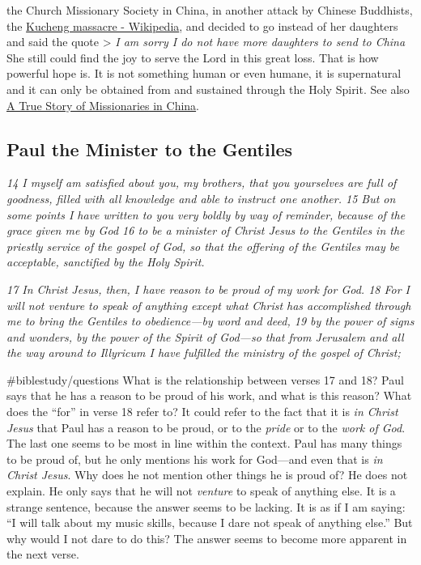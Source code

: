 the Church Missionary Society in China, in another attack by Chinese
Buddhists, the
\href{\%5Bhttps://en.wikipedia.org/wiki/Kucheng_massacre\%5D(https://en.wikipedia.org/wiki/Kucheng_massacre)}{Kucheng
massacre - Wikipedia}, and decided to go instead of her daughters and
said the quote \textgreater{} \emph{I am sorry I do not have more
daughters to send to China}\\
She still could find the joy to serve the Lord in this great loss. That
is how powerful hope is. It is not something human or even humane, it is
supernatural and it can only be obtained from and sustained through the
Holy Spirit. See also
\href{\%5Bhttps://www.youtube.com/watch?v=-DSjhwICEB4\%5D(https://www.youtube.com/watch?v=-DSjhwICEB4)}{A
True Story of Missionaries in China}.

\subsection{Paul the Minister to the Gentiles} \emph{14 I myself am
satisfied about you, my brothers, that you yourselves are full of
goodness, filled with all knowledge and able to instruct one another. 15
But on some points I have written to you very boldly by way of reminder,
because of the grace given me by God 16 to be a minister of Christ Jesus
to the Gentiles in the priestly service of the gospel of God, so that
the offering of the Gentiles may be acceptable, sanctified by the Holy
Spirit.}

\emph{17 In Christ Jesus, then, I have reason to be proud of my work for
God. 18 For I will not venture to speak of anything except what Christ
has accomplished through me to bring the Gentiles to obedience---by word
and deed, 19 by the power of signs and wonders, by the power of the
Spirit of God---so that from Jerusalem and all the way around to
Illyricum I have fulfilled the ministry of the gospel of Christ;}

\#biblestudy/questions What is the relationship between verses 17 and
18? Paul says that he has a reason to be proud of his work, and what is
this reason? What does the ``for'' in verse 18 refer to? It could refer
to the fact that it is \emph{in Christ Jesus} that Paul has a reason to
be proud, or to the \emph{pride} or to the \emph{work of God}. The last
one seems to be most in line within the context. Paul has many things to
be proud of, but he only mentions his work for God---and even that is
\emph{in Christ Jesus}. Why does he not mention other things he is proud
of? He does not explain. He only says that he will not \emph{venture} to
speak of anything else. It is a strange sentence, because the answer
seems to be lacking. It is as if I am saying: ``I will talk about my
music skills, because I dare not speak of anything else.'' But why would
I not dare to do this? The answer seems to become more apparent in the
next verse.


